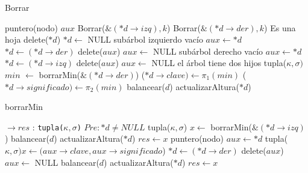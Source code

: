 \begin{Algoritmos}
\begin{algorithm}
\caption{Borrar}
\begin{algorithmic}[1]
	\State puntero(nodo) $aux$
		\State Borrar($\&(*d\to izq), k$)
	\Else 
			\State Borrar($\&(*d\to der), k$)
		\Else 
				\Comment Es una hoja
				\State delete($*d$)
				\State $*d\gets$ NULL
			\Else
					\Comment subárbol izquierdo vacío
					\State $aux \gets *d$
					\State $*d\gets (*d\to der)$
					\State delete($aux$)
					\State $aux \gets$ NULL
				\Else
						\Comment subárbol derecho vacío
						\State $aux \gets *d$
						\State $*d\gets (*d\to izq)$
						\State delete($aux$)
						\State $aux \gets$ NULL
					\Else
						\Comment el árbol tiene dos hijos
						\State tupla($\kappa, \sigma)$ $min$ $\gets$ borrarMin($\&(*d\to der)$)
						\State($*d\to clave) \gets \pi_1(min)$
						\State($*d\to significado) \gets \pi_2(min)$
					\EndIf
				\EndIf
			\EndIf 
		\EndIf
	\EndIf
	\State balancear($d$)
	\State actualizarAltura($*d$)
\EndProcedure
\end{algorithmic}
\end{algorithm}

\begin{algorithm}
\caption{borrarMin}
\begin{algorithmic}[1]
$\to res$ : \texttt{tupla($\kappa, \sigma$)}
	\Comment $Pre: *d \neq NULL$
	\If{$*d\to izq \neq$ NULL}
		\State tupla($\kappa, \sigma$) $x\gets$ borrarMin($\&(*d\to izq)$)
		\State balancear($d$)
		\State actualizarAltura($*d$)
		\State $res \gets x$
	\Else
		\State puntero(nodo) $aux \gets *d$
		\State tupla($\kappa, \sigma) x \gets (aux\to clave, aux\to significado$)
		\State $*d\gets (*d\to der)$
		\State delete($aux$)
		\State $aux \gets$ NULL
		\State balancear($d$)
		\State actualizarAltura($*d$)
		\State $res \gets x$
	\EndIf
\EndProcedure
\end{algorithmic}
\end{algorithm}

\end{Algoritmos}